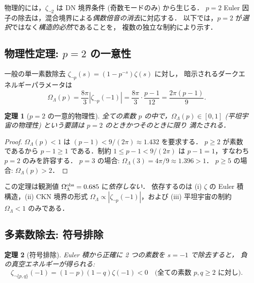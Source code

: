 \documentclass[11pt,a4paper]{article}
\newtheorem{theorem}{定理}
\begin{document}
物理的には，$\zeta_{\neg 2}$ は DN 境界条件 (奇数モードのみ) から生じる．
$p = 2$ Euler 因子の除去は，混合境界による\emph{偶数倍音の消去}に対応する．
以下では，$p = 2$ が\emph{選択}ではなく\emph{構造的必然}であることを，
複数の独立な制約により示す．

\subsection{物理性定理: $p = 2$ の一意性}

一般の単一素数除去 $\zeta_{\neg p}(s) = (1 - p^{-s})\zeta(s)$ に対し，
暗示されるダークエネルギーパラメータは
\begin{equation}
\Omega_\Lambda(p) = \frac{8\pi}{3}|\zeta_{\neg p}(-1)|
= \frac{8\pi}{3}\cdot\frac{p-1}{12} = \frac{2\pi(p-1)}{9}.
\end{equation}

\begin{theorem}[$p = 2$ の一意的物理性]\label{th:unique}
全ての素数 $p$ の中で，$\Omega_\Lambda(p) \in [0, 1]$
(平坦宇宙の物理性) という要請は $p = 2$ のときかつそのときに限り
満たされる．
\end{theorem}

\begin{proof}
$\Omega_\Lambda(p) < 1$ は $(p-1) < 9/(2\pi) \approx 1.432$ を要求する．
$p \geq 2$ が素数であるから $p - 1 \geq 1$ である．制約
$1 \leq p - 1 < 9/(2\pi)$ は $p - 1 = 1$，すなわち $p = 2$ のみを許容する．
$p = 3$ の場合: $\Omega_\Lambda(3) = 4\pi/9 \approx 1.396 > 1$．
$p \geq 5$ の場合: $\Omega_\Lambda(p) > 2$．
\end{proof}

この定理は観測値 $\Omega_\Lambda^{\rm obs} = 0.685$ に\emph{依存しない}．
依存するのは (i) $\zeta$ の Euler 積構造，(ii) CKN 境界の形式
$\Omega_\Lambda \propto |\zeta_{\neg p}(-1)|$，および
(iii) 平坦宇宙の制約 $\Omega_\Lambda < 1$ のみである．

\subsection{多素数除去: 符号排除}

\begin{theorem}[符号排除]\label{th:sign}
Euler 積から正確に 2 つの素数を $s = -1$ で除去すると，
\emph{負の}真空エネルギーが得られる:
\begin{equation}
\zeta_{\neg\{p,q\}}(-1) = (1-p)(1-q)\zeta(-1) < 0
\quad \text{(全ての素数 } p, q \geq 2 \text{ に対し)}.
\end{equation}
\end{theorem}
\end{document}
